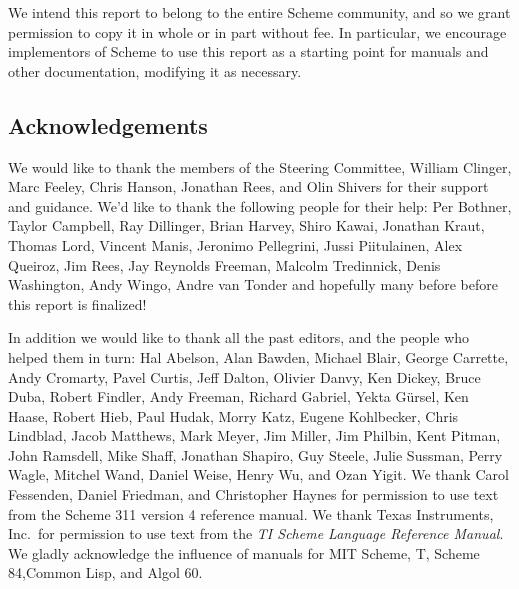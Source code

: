 \medskip

We intend this report to belong to the entire Scheme community, and so
we grant permission to copy it in whole or in part without fee.  In
particular, we encourage implementors of Scheme to use this report as
a starting point for manuals and other documentation, modifying it as
necessary.




\subsection*{Acknowledgements}

We would like to thank the members of the Steering Committee, William
Clinger, Marc Feeley, Chris Hanson, Jonathan Rees, and Olin Shivers for
their support and guidance.  We'd like to thank the following people
for their help:
Per Bothner, Taylor Campbell, Ray Dillinger, Brian Harvey, Shiro Kawai,
Jonathan Kraut, Thomas Lord, Vincent Manis, Jeronimo Pellegrini,
Jussi Piitulainen, Alex Queiroz, Jim Rees, Jay Reynolds Freeman,
Malcolm Tredinnick, Denis Washington, Andy Wingo, Andre van Tonder and
hopefully many before before this report is finalized!


In addition we would like to thank all the past editors, and the
people who helped them in turn: Hal Abelson, Alan Bawden, Michael
Blair, George Carrette, Andy Cromarty, Pavel Curtis, Jeff Dalton,
Olivier Danvy, Ken Dickey, Bruce Duba, Robert Findler, Andy Freeman,
Richard Gabriel, Yekta G\"ursel, Ken Haase, Robert Hieb, Paul Hudak,
Morry Katz, Eugene Kohlbecker, Chris Lindblad, Jacob Matthews, Mark
Meyer, Jim Miller, Jim Philbin, Kent Pitman, John Ramsdell, Mike
Shaff, Jonathan Shapiro, Guy Steele, Julie Sussman, Perry Wagle,
Mitchel Wand, Daniel Weise, Henry Wu, and Ozan Yigit.  We thank Carol
Fessenden, Daniel Friedman, and Christopher Haynes for permission to
use text from the Scheme 311 version 4 reference manual.  We thank
Texas Instruments, Inc.~for permission to use text from the {\em TI
Scheme Language Reference Manual}\cite{TImanual85}.  We gladly
acknowledge the influence of manuals for MIT Scheme\cite{MITScheme},
T\cite{Rees84}, Scheme 84\cite{Scheme84},Common Lisp\cite{CLtL}, and
Algol 60\cite{Naur63}.


